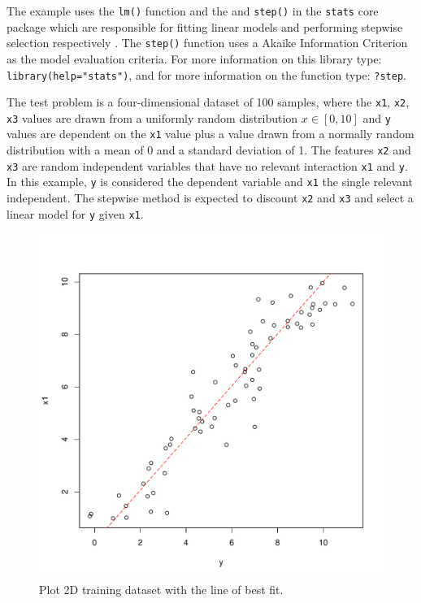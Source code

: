 The example uses the \texttt{lm()} function and the and \texttt{step()} in the \texttt{stats} core package which are responsible for fitting linear models and performing stepwise selection respectively \cite{RDCT2011a}. The \texttt{step()} function uses a Akaike Information Criterion as the model evaluation criteria. For more information on this library type: \texttt{library(help="stats")}, and for more information on the function type: \texttt{?step}.

The test problem is a four-dimensional dataset of 100 samples, where the \texttt{x1}, \texttt{x2}, \texttt{x3} values are drawn from a uniformly random distribution $x \in [0,10]$ and \texttt{y} values are dependent on the \texttt{x1} value plus a value drawn from a normally random distribution with a mean of 0 and a standard deviation of 1. The features \texttt{x2} and \texttt{x3} are random independent variables that have no relevant interaction \texttt{x1} and \texttt{y}. In this example, \texttt{y} is considered the dependent variable and \texttt{x1} the single relevant independent. The stepwise method is expected to discount \texttt{x2} and \texttt{x3} and select a linear model for \texttt{y} given \texttt{x1}.



\begin{figure}[htp]
\centering
\includegraphics[scale=0.45]{a_regression/stepwise_regression_result.pdf}
\caption{Plot 2D training dataset with the line of best fit.}
\label{plot:stepwise_regression_result}
\end{figure}

